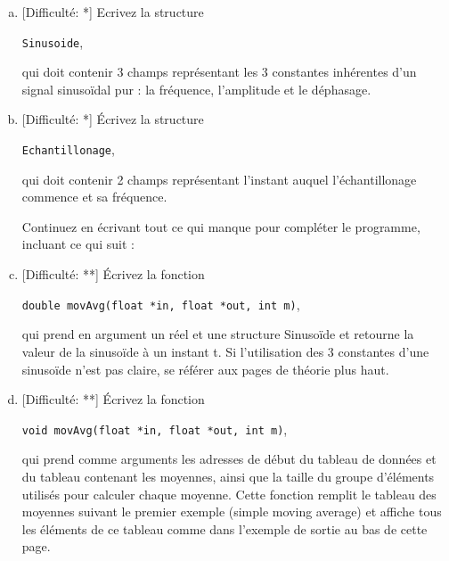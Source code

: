\documentclass[11pt]{article}
\begin{document}
\newpage
\begin{enumerate}[a)]


\item \textcolor{mygreen}{[Difficulté: *]}
Ecrivez la structure
\begin{center}
\texttt{Sinusoide}, 
\end{center}
qui doit contenir 3 champs représentant les 3 constantes inhérentes d'un signal sinusoïdal pur : la fréquence, l'amplitude et le déphasage.

\item \textcolor{mygreen}{[Difficulté: *]}
Écrivez la structure
\begin{center} 
\texttt{Echantillonage}, 
\end{center}
qui doit contenir 2 champs représentant l'instant auquel l'échantillonage commence et sa fréquence.

\vspace{20pt}
\hspace{-20pt} Continuez en écrivant tout ce qui manque pour compléter le programme, incluant ce qui suit :
\vspace{20pt}

\item \textcolor{mygreen}{[Difficulté: **]}
Écrivez la fonction
\begin{center} 
\texttt{double movAvg(float *in, float *out, int m)}, 
\end{center}
qui prend en argument un réel et une structure Sinusoïde et retourne la valeur de la sinusoïde à un instant t. Si l'utilisation des 3 constantes d'une sinusoïde n'est pas claire, se référer aux pages de théorie plus haut.

\vspace{20pt}


\item \textcolor{mygreen}{[Difficulté: **]}
Écrivez la fonction 

\begin{center}
\texttt{void movAvg(float *in, float *out, int m)}, 
\end{center}

qui prend comme arguments les adresses de début du tableau de données et du tableau contenant les moyennes, ainsi que la taille du groupe d'éléments utilisés pour calculer chaque moyenne. Cette fonction remplit le tableau des moyennes suivant le premier exemple (simple moving average) et affiche tous les éléments de ce tableau comme dans l'exemple de sortie au bas de cette page.


\end{enumerate}
\end{document}
